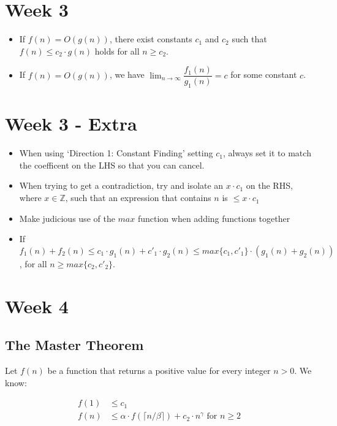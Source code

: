 \documentclass[1pt,a4paper]{article}
\begin{document}
\begin{multicols}{3}

\section{Week 3}

\begin{itemize}
\item If $f(n) = O(g(n))$, there exist constants $c_1$ and $c_2$ such that $f(n) \leqslant c_2 \cdot g(n)$ holds for all $n \geqslant c_2$.
\item If $f(n) = O(g(n))$, we have $\lim_{n \to \infty} \dfrac{f_1(n)}{g_1(n)} = c$ for some constant $c$. 
\end{itemize}

\section{Week 3 - Extra}

\begin{itemize}
\item When using `Direction 1: Constant Finding' setting $c_1$, always set it to match the coefficent on the LHS so that you can cancel.
\item When trying to get a contradiction, try and isolate an $x \cdot c_1$ on the RHS, where $x \in \mathbb{Z}$, such that an expression that contains $n$ is $\leqslant x \cdot c_1$
\item Make judicious use of the $max$ function when adding functions together
\item If $f_1(n) + f_2(n) \leqslant c_1 \cdot g_1(n) +c'_1 \cdot g_2(n) \leqslant max\{c_1 , c'_1 \} \cdot (g_1(n) + g_2(n))$, for all $n \geqslant max\{c_2, c'_2\}$.
\end{itemize}

\section{Week 4}
\subsection{The Master Theorem}

Let $f(n)$ be a function that returns a positive value for every integer $n>0$. We know:

\begin{align*}
f(1) & \leqslant c_1\\
f(n) & \leqslant \alpha \cdot f(\lceil n / \beta \rceil) + c_2 \cdot n^{\gamma} \text{ for } n \geqslant 2
\end{align*}


\end{multicols}
\end{document}
